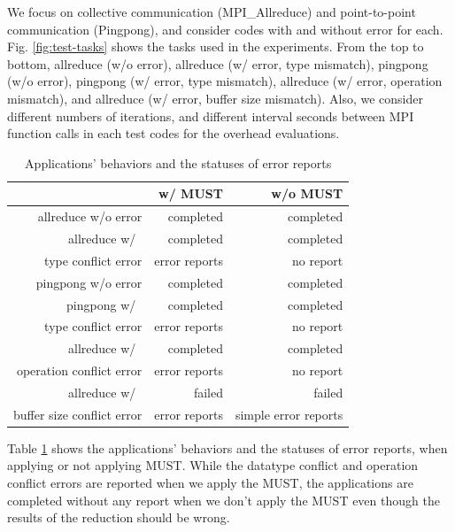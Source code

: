 \documentclass[graybox]{svmult}
\begin{document}
We focus on collective communication (MPI\_Allreduce) and point-to-point communication (Pingpong), and consider codes with and without error for each. 
Fig. \ref{fig:test-tasks} shows the tasks used in the experiments. 
From the top to bottom, allreduce (w/o error), allreduce (w/ error, type mismatch), pingpong (w/o error), pingpong (w/ error, type mismatch), allreduce (w/ error, operation mismatch), and allreduce (w/ error, buffer size mismatch). 
Also, we consider different numbers of iterations, and different interval seconds between MPI function calls in each test codes for the overhead evaluations. 

\begin{table}[t]
\caption{Applications' behaviors and the statuses of error reports}
\label{table:stats}
 \begin{center}
  \begin{tabular}[t]{|r|r|r|}\hline\hline
   & w/ MUST & w/o MUST \\\hline
  allreduce w/o error & completed & completed \\\hline
  allreduce w/~ & completed & completed \\
  type conflict error &  error reports & no report\\\hline
  pingpong w/o error & completed & completed \\\hline
  pingpong w/~ & completed & completed \\
  type conflict error &  error reports &  no report\\\hline
  allreduce w/~ & completed & completed \\
  operation conflict error &  error reports &  no report\\\hline
  allreduce w/~ & failed & failed \\
  buffer size conflict error & error reports  & simple error reports \\\hline
  \end{tabular}
 \end{center}
\end{table}

Table \ref{table:stats} shows the applications' behaviors and the statuses of error reports, when applying or not applying MUST.
While the datatype conflict and operation conflict errors are reported when we apply the MUST, the applications are completed without any report when we don't apply the MUST even though the results of the reduction should be wrong. 
\end{document}
